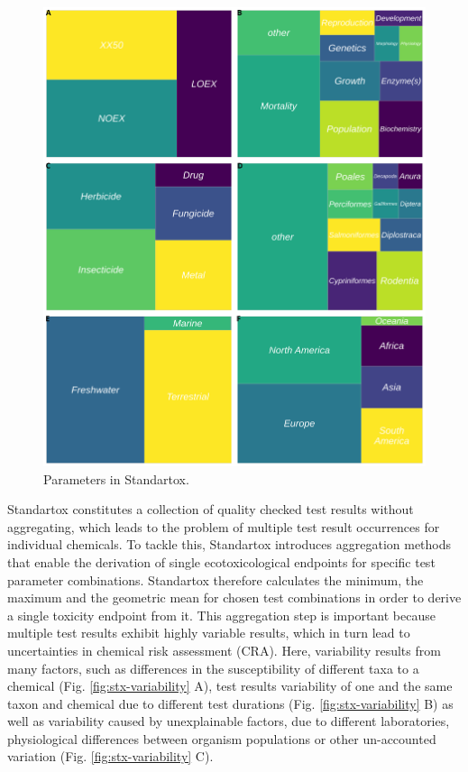 \begin{figure}
    \includegraphics[width=1.0\textwidth]{article/figures/standartox_parameters.png}
    \caption{Parameters in Standartox.}
    \label{fig:stx-parameters}
\end{figure}

Standartox constitutes a collection of quality checked test results without aggregating, which leads to the problem of multiple test result occurrences for individual chemicals. To tackle this, Standartox introduces aggregation methods that enable the derivation of single ecotoxicological endpoints for specific test parameter combinations. Standartox therefore calculates the minimum, the maximum and the geometric mean for chosen test combinations in order to derive a single toxicity endpoint from it. This aggregation step is important because multiple test results exhibit highly variable results, which in turn lead to uncertainties in chemical risk assessment (CRA). Here, variability results from many factors, such as differences in the susceptibility of different taxa to a chemical (Fig. \ref{fig:stx-variability} A), test results variability of one and the same taxon and chemical due to different test durations (Fig. \ref{fig:stx-variability} B) as well as variability caused by unexplainable factors, due to different laboratories, physiological differences between organism populations or other un-accounted variation (Fig. \ref{fig:stx-variability} C).

